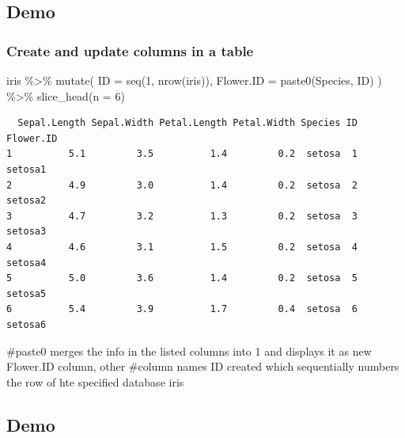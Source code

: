 \documentclass[
  letterpaper,
  DIV=11,
  numbers=noendperiod]{scrartcl}
\newenvironment{Shaded}{\begin{snugshade}}{\end{snugshade}}
\newcommand{\AttributeTok}[1]{\textcolor[rgb]{0.40,0.45,0.13}{#1}}
\newcommand{\CommentTok}[1]{\textcolor[rgb]{0.37,0.37,0.37}{#1}}
\newcommand{\DecValTok}[1]{\textcolor[rgb]{0.68,0.00,0.00}{#1}}
\newcommand{\FunctionTok}[1]{\textcolor[rgb]{0.28,0.35,0.67}{#1}}
\newcommand{\NormalTok}[1]{\textcolor[rgb]{0.00,0.23,0.31}{#1}}
\newcommand{\SpecialCharTok}[1]{\textcolor[rgb]{0.37,0.37,0.37}{#1}}
\begin{document}
\subsection{Demo}\label{demo-5}

\subsubsection{Create and update columns in a
table}\label{create-and-update-columns-in-a-table}

\begin{Shaded}
\begin{Highlighting}[]
\NormalTok{iris }\SpecialCharTok{\%\textgreater{}\%}
    \FunctionTok{mutate}\NormalTok{(}
        \AttributeTok{ID =} \FunctionTok{seq}\NormalTok{(}\DecValTok{1}\NormalTok{, }\FunctionTok{nrow}\NormalTok{(iris)),}
        \AttributeTok{Flower.ID =} \FunctionTok{paste0}\NormalTok{(Species, ID)}
\NormalTok{        ) }\SpecialCharTok{\%\textgreater{}\%}
    \FunctionTok{slice\_head}\NormalTok{(}\AttributeTok{n =} \DecValTok{6}\NormalTok{)}
\end{Highlighting}
\end{Shaded}

\begin{verbatim}
  Sepal.Length Sepal.Width Petal.Length Petal.Width Species ID Flower.ID
1          5.1         3.5          1.4         0.2  setosa  1   setosa1
2          4.9         3.0          1.4         0.2  setosa  2   setosa2
3          4.7         3.2          1.3         0.2  setosa  3   setosa3
4          4.6         3.1          1.5         0.2  setosa  4   setosa4
5          5.0         3.6          1.4         0.2  setosa  5   setosa5
6          5.4         3.9          1.7         0.4  setosa  6   setosa6
\end{verbatim}

\begin{Shaded}
\begin{Highlighting}[]
\CommentTok{\#paste0 merges the info in the listed columns into 1 and displays it as new Flower.ID column, other \#column names ID created which sequentially numbers the row of hte specified database iris }
\end{Highlighting}
\end{Shaded}

\subsection{Demo}\label{demo-6}
\end{document}
